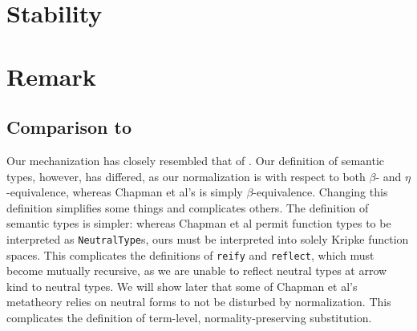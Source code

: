 \documentclass[authoryear, acmsmall, screen, review, nonacm]{acmart}
\begin{document}
\section{Stability}

\section{Remark}

\subsection{Comparison to \citet{ChapmanKNW19}}
Our mechanization has closely resembled that of \citet{ChapmanKNW19}. Our definition of semantic types, however, has differed, as our normalization is with respect to both $\beta$- and $\eta$-equivalence, whereas Chapman et al's is simply $\beta$-equivalence. Changing this definition simplifies some things and complicates others. The definition of semantic types is simpler: whereas Chapman et al permit function types to be interpreted as \verb!NeutralType!s, ours must be interpreted into solely Kripke function spaces. This complicates the definitions of \verb!reify! and \verb!reflect!, which must become mutually recursive, as we are unable to reflect neutral types at arrow kind to neutral types. We will show later that some of Chapman et al's metatheory relies on neutral forms to not be disturbed by normalization. This complicates the definition of term-level, normality-preserving substitution.




\end{document}

